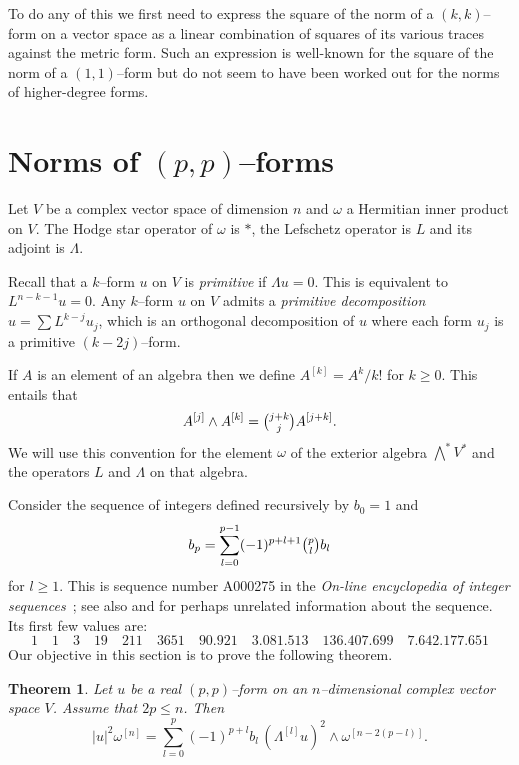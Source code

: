 \documentclass[11pt,a4paper]{amsart}
\def\^#1{^{[#1]}}
\newtheorem{theo}{Theorem}[section]
\theoremstyle{definition}
\numberwithin{equation}{section}
\begin{document}
To do any of this we first need to express the square of the norm of a
$(k,k)$--form on a vector space as a linear combination of squares of its
various traces against the metric form. Such an expression is well-known
for the square of the norm of a $(1,1)$--form but do not seem to have been
worked out for the norms of higher-degree forms.




\section{Norms of $(p,p)$--forms}



Let $V$ be a complex vector space of dimension $n$ and $\omega$ a Hermitian
inner product on $V$. The Hodge star operator of $\omega$ is $*$,
the Lefschetz operator is $L$ and its adjoint is $\Lambda$. 

Recall that a $k$--form $u$ on $V$ is \emph{primitive} if $\Lambda u = 0$.
This is equivalent to $L^{n-k-1}u = 0$. Any $k$--form $u$ on $V$ admits a
\emph{primitive decomposition} $u = \sum L^{k-j} u_j$, which is an
orthogonal decomposition of $u$ where each form $u_j$ is a primitive
$(k-2j)$--form.

If $A$ is an element of an algebra then we define $A\^k = A^k / k!$ for $k
\geq 0$. This entails that
$$
A\^j \wedge A\^k = \tbinom{j+k}{j} A\^{j+k}.
$$
We will use this convention for the element $\omega$ of the exterior
algebra $\bigwedge^* V^*$ and the operators $L$ and $\Lambda$ on that
algebra.



Consider the sequence of integers defined recursively by $b_0 = 1$ and
$$
b_p = \sum_{l=0}^{p-1} (-1)^{p+l+1} \tbinom{p}{l} b_l
$$
for $l \geq 1$. This is sequence number A000275 in the \textsl{On-line
encyclopedia of integer sequences}~\cite{OEIS}; see also \cite{Carlitz}
and \cite{Riordan} for perhaps unrelated information about the sequence.
Its first few values are: 
$$
1 \quad 1 \quad 3 \quad 19 \quad 211 \quad 3651 \quad
90.921 \quad 3.081.513 \quad 136.407.699 \quad 7.642.177.651
$$
Our objective in this section is to prove the following theorem.


\begin{theo}
    \label{thm:norm}
Let $u$ be a real $(p,p)$--form on an $n$--dimensional complex vector
space $V$. Assume that $2p \leq n$. Then
$$
\lvert u \rvert^2 \omega\^n
= \sum_{l=0}^{p} 
(-1)^{p+l} b_l \, (\Lambda\^l u)^2 \wedge \omega\^{n-2(p-l)}.
$$
\end{theo}
\end{document}
